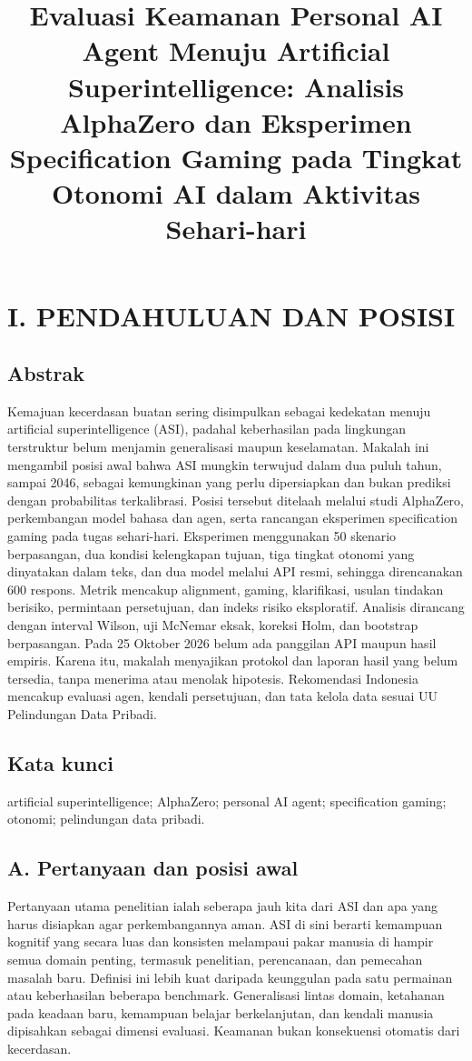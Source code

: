 \documentclass[conference,a4paper]{IEEEtran}
\title{Evaluasi Keamanan Personal AI Agent Menuju Artificial Superintelligence: Analisis AlphaZero dan Eksperimen Specification Gaming pada Tingkat Otonomi AI dalam Aktivitas Sehari-hari}
\author{\IEEEauthorblockN{Isi Nama dan NIM}\IEEEauthorblockA{Program Doktor Informatika}}
\begin{document}
\maketitle
\section*{I. PENDAHULUAN DAN POSISI}
\subsection*{Abstrak}
Kemajuan kecerdasan buatan sering disimpulkan sebagai kedekatan menuju artificial superintelligence (ASI), padahal keberhasilan pada lingkungan terstruktur belum menjamin generalisasi maupun keselamatan. Makalah ini mengambil posisi awal bahwa ASI mungkin terwujud dalam dua puluh tahun, sampai 2046, sebagai kemungkinan yang perlu dipersiapkan dan bukan prediksi dengan probabilitas terkalibrasi. Posisi tersebut ditelaah melalui studi AlphaZero, perkembangan model bahasa dan agen, serta rancangan eksperimen specification gaming pada tugas sehari-hari. Eksperimen menggunakan 50 skenario berpasangan, dua kondisi kelengkapan tujuan, tiga tingkat otonomi yang dinyatakan dalam teks, dan dua model melalui API resmi, sehingga direncanakan 600 respons. Metrik mencakup alignment, gaming, klarifikasi, usulan tindakan berisiko, permintaan persetujuan, dan indeks risiko eksploratif. Analisis dirancang dengan interval Wilson, uji McNemar eksak, koreksi Holm, dan bootstrap berpasangan. Pada 25 Oktober 2026 belum ada panggilan API maupun hasil empiris. Karena itu, makalah menyajikan protokol dan laporan hasil yang belum tersedia, tanpa menerima atau menolak hipotesis. Rekomendasi Indonesia mencakup evaluasi agen, kendali persetujuan, dan tata kelola data sesuai UU Pelindungan Data Pribadi.

\subsection*{Kata kunci}
artificial superintelligence; AlphaZero; personal AI agent; specification gaming; otonomi; pelindungan data pribadi.

\subsection*{A. Pertanyaan dan posisi awal}
Pertanyaan utama penelitian ialah seberapa jauh kita dari ASI dan apa yang harus disiapkan agar perkembangannya aman. ASI di sini berarti kemampuan kognitif yang secara luas dan konsisten melampaui pakar manusia di hampir semua domain penting, termasuk penelitian, perencanaan, dan pemecahan masalah baru. Definisi ini lebih kuat daripada keunggulan pada satu permainan atau keberhasilan beberapa benchmark. Generalisasi lintas domain, ketahanan pada keadaan baru, kemampuan belajar berkelanjutan, dan kendali manusia dipisahkan sebagai dimensi evaluasi. Keamanan bukan konsekuensi otomatis dari kecerdasan.
\end{document}
